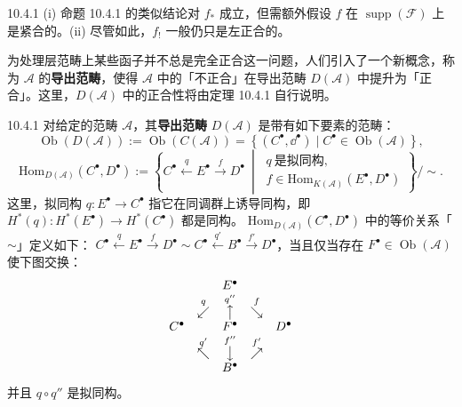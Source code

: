 \begin{wrem}{10.4.1}
(i) 命题 10.4.1 的类似结论对 $f_\ast$ 成立，但需额外假设 $f$ 在
$\operatorname{supp}(\mathcal F)$ 上是紧合的。(ii) 尽管如此，$f_!$ 一般仍只是左正合的。
\end{wrem}

为处理层范畴上某些函子并不总是完全正合这一问题，人们引入了一个新概念，称为
$\mathcal A$ 的\textbf{导出范畴}，使得 $\mathcal A$ 中的「不正合」在导出范畴
$D(\mathcal A)$ 中提升为「正合」。这里，$D(\mathcal A)$ 中的正合性将由定理 10.4.1
自行说明。

\begin{wdefn}{10.4.1}
对给定的范畴 $\mathcal A$，其\textbf{导出范畴} $D(\mathcal A)$ 是带有如下要素的范畴：
\[
\operatorname{Ob}(D(\mathcal A)):=\operatorname{Ob}(C(\mathcal A))
=\left\{(C^\bullet,\dd^\bullet)\mid C^\bullet\in\operatorname{Ob}(\mathcal A)\right\},
\]
\[
\mathrm{Hom}_{D(\mathcal A)}(C^\bullet,D^\bullet):=
\left\{
C^\bullet\xleftarrow{q}E^\bullet\xrightarrow{f}D^\bullet\ \middle|\
\begin{array}{l}
q\ \text{是拟同构},\\
f\in\mathrm{Hom}_{K(\mathcal A)}(E^\bullet,D^\bullet)
\end{array}
\right\}\Big/\sim.
\]
这里，拟同构 $q:E^\bullet\to C^\bullet$ 指它在同调群上诱导同构，即
$H^*(q):H^*(E^\bullet)\to H^*(C^\bullet)$ 都是同构。
$\mathrm{Hom}_{D(\mathcal A)}(C^\bullet,D^\bullet)$ 中的等价关系「$\sim$」定义如下：
$C^\bullet\xleftarrow{q}E^\bullet\xrightarrow{f}D^\bullet
\sim C^\bullet\xleftarrow{q'}B^\bullet\xrightarrow{f'}D^\bullet$，当且仅当存在
$F^\bullet\in\operatorname{Ob}(\mathcal A)$ 使下图交换：
\[
\begin{array}{ccccc}
& & E^\bullet & & \\
& \overset{\scriptstyle q}{\swarrow} & \overset{\scriptstyle q''}{\big\uparrow}
& \overset{\scriptstyle f}{\searrow} & \\
C^\bullet & & F^\bullet & & D^\bullet\\
& \overset{\scriptstyle q'}{\nwarrow} & \overset{\scriptstyle f''}{\big\downarrow}
& \overset{\scriptstyle f'}{\nearrow} & \\
& & B^\bullet & &
\end{array}
\]
并且 $q\circ q''$ 是拟同构。
\end{wdefn}



